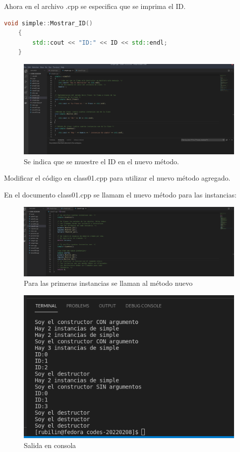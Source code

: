 \documentclass[11pt]{article}
\begin{document}
Ahora en el archivo .cpp se especifica que se imprima el ID.

\begin{lstlisting}[language=c++]
	void simple::Mostrar_ID()
	{
		std::cout << "ID:" << ID << std::endl;
	}
\end{lstlisting}


\begin{figure}[H]
	\centering
	\includegraphics[width=0.7\linewidth]{img5}
	\caption{Se indica que se muestre el ID en el nuevo método.}
	\label{fig:img5}
\end{figure}






	\begin{problem}
		Modificar el código en class01.cpp para utilizar el nuevo
		método agregado.
	\end{problem}


En el documento class01.cpp se llamam el nuevo método para las instancias:

\begin{figure}[H]
	\centering
	\includegraphics[width=0.7\linewidth]{img6}
	\caption{Para las primeras instancias se llaman al método nuevo}
	\label{fig:img6}
\end{figure}


\begin{figure}[H]
	\centering
	\includegraphics[width=0.7\linewidth]{img7}
	\caption{Salida en consola}
	\label{fig:img7}
\end{figure}





	
	
	
	\vspace{0.1 in}
	
\end{document}
